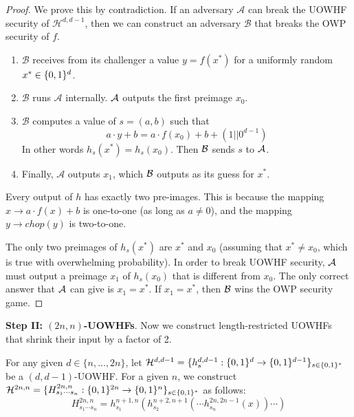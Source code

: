 \begin{proof}
    We prove this by contradiction. If an adversary $\mathcal{A}$ can break the UOWHF security of $\mathcal{H}^{d, d-1}$, then we can construct an adversary $\mathcal{B}$ that breaks the OWP security of $f$. 

    \begin{enumerate}
        \item $\mathcal{B}$ receives from its challenger a value $y = f(x^*)$ for a uniformly random $x^* \in \{0,1\}^d$.
        \item $\mathcal{B}$ runs $\mathcal{A}$ internally. $\mathcal{A}$ outputs the first preimage $x_0$.
        \item $\mathcal{B}$ computes a value of $s=(a,b)$ such that 
        \[a \cdot y + b = a \cdot f(x_0) + b + (1 || 0^{d-1})\] 
        In other words $h_s(x^*) = h_s(x_0)$. Then $\mathcal{B}$ sends $s$ to $\mathcal{A}$.
        \item Finally, $\mathcal{A}$ outputs $x_1$, which $\mathcal{B}$ outputs as its guess for $x^*$. 
    \end{enumerate} 
    
    Every output of $h$ has exactly two pre-images. This is because the mapping $x \to a \cdot f(x) + b$ is one-to-one (as long as $a \neq 0$), and the mapping $y \to chop(y)$ is two-to-one.

    The only two preimages of $h_s(x^*)$ are $x^*$ and $x_0$ (assuming that $x^* \neq x_0$, which is true with overwhelming probability). In order to break UOWHF security, $\mathcal{A}$ must output a preimage $x_1$ of $h_s(x_0)$ that is different from $x_0$. The only correct answer that $\mathcal{A}$ can give is $x_1 = x^*$. If $x_1 = x^*$, then $\mathcal{B}$ wins the OWP security game.
\end{proof}
\vspace{5mm}

\noindent\textbf{Step II: $(2n, n)$-UOWHFs}.
Now we construct length-restricted UOWHFs that shrink their input by a factor of 2.

\begin{construction}\label{construction-2}
    For any given $d \in \{n, \dots, 2n\}$, let $\mathcal{H}^{d, d-1} = \{h_s^{d, d-1}: \{0,1\}^{d}\rightarrow\{0,1\}^{d-1}\}_{s\in\{0,1\}^{*}}$ be a $(d, d-1)$-UOWHF. For a given $n$, we construct $\mathcal{H}^{2n, n} = \{H^{2n, n}_{s_1\cdots s_n}:\{0,1\}^{2n}\rightarrow\{0,1\}^{n}\}_{s \in \{0,1\}^*}$ as follows:
    \[
        H^{2n, n}_{s_1\cdots s_n}=h_{s_1}^{n+1,n}(h_{s_2}^{n+2,n+1}(\cdots h_{s_n}^{2n,2n-1}(x))\cdots)
    \]
\end{construction}

